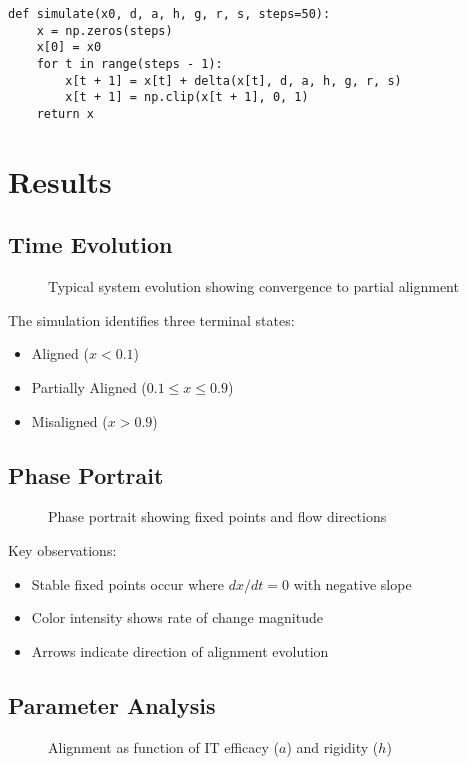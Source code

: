 \documentclass[a4paper, 12pt]{article}
\begin{document}
\begin{lstlisting}[caption=Core Simulation Code]
def simulate(x0, d, a, h, g, r, s, steps=50):
    x = np.zeros(steps)
    x[0] = x0
    for t in range(steps - 1):
        x[t + 1] = x[t] + delta(x[t], d, a, h, g, r, s)
        x[t + 1] = np.clip(x[t + 1], 0, 1)
    return x
\end{lstlisting}

\section{Results}
\subsection{Time Evolution}
\begin{figure}[h]
	\centering
	\caption{Typical system evolution showing convergence to partial alignment}
\end{figure}

The simulation identifies three terminal states:
\begin{itemize}
	\item Aligned ($x < 0.1$)
	\item Partially Aligned ($0.1 \leq x \leq 0.9$)
	\item Misaligned ($x > 0.9$)
\end{itemize}

\subsection{Phase Portrait}
\begin{figure}[h]
	\centering
	\caption{Phase portrait showing fixed points and flow directions}
\end{figure}

Key observations:
\begin{itemize}
	\item Stable fixed points occur where $dx/dt = 0$ with negative slope
	\item Color intensity shows rate of change magnitude
	\item Arrows indicate direction of alignment evolution
\end{itemize}

\subsection{Parameter Analysis}
\begin{figure}[h]
	\centering
	\caption{Alignment as function of IT efficacy ($a$) and rigidity ($h$)}
\end{figure}
\end{document}
